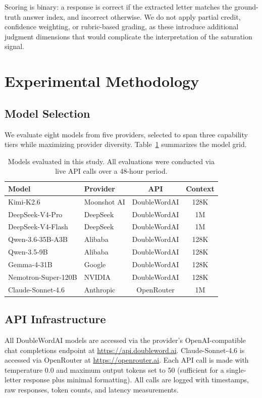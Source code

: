 \documentclass[final]{elsarticle}
\begin{document}
Scoring is binary: a response is correct if the extracted letter matches the ground-truth answer index, and incorrect otherwise. We do not apply partial credit, confidence weighting, or rubric-based grading, as these introduce additional judgment dimensions that would complicate the interpretation of the saturation signal.

\section{Experimental Methodology}

\subsection{Model Selection}

We evaluate eight models from five providers, selected to span three capability tiers while maximizing provider diversity. Table~\ref{tab:models} summarizes the model grid.

\begin{table}[t]
\centering
\caption{Models evaluated in this study. All evaluations were conducted via live API calls over a 48-hour period.}
\label{tab:models}
\small
\begin{tabular}{llcc}
\toprule
\textbf{Model} & \textbf{Provider} & \textbf{API} & \textbf{Context} \\
\midrule
Kimi-K2.6 & Moonshot AI & DoubleWordAI & 128K \\
DeepSeek-V4-Pro & DeepSeek & DoubleWordAI & 1M \\
DeepSeek-V4-Flash & DeepSeek & DoubleWordAI & 1M \\
Qwen-3.6-35B-A3B & Alibaba & DoubleWordAI & 128K \\
Qwen-3.5-9B & Alibaba & DoubleWordAI & 128K \\
Gemma-4-31B & Google & DoubleWordAI & 128K \\
Nemotron-Super-120B & NVIDIA & DoubleWordAI & 128K \\
Claude-Sonnet-4.6 & Anthropic & OpenRouter & 1M \\
\bottomrule
\end{tabular}
\end{table}

\subsection{API Infrastructure}

All DoubleWordAI models are accessed via the provider's OpenAI-compatible chat completions endpoint at \url{https://api.doubleword.ai}. Claude-Sonnet-4.6 is accessed via OpenRouter at \url{https://openrouter.ai}. Each API call is made with temperature 0.0 and maximum output tokens set to 50 (sufficient for a single-letter response plus minimal formatting). All calls are logged with timestamps, raw responses, token counts, and latency measurements.
\end{document}
